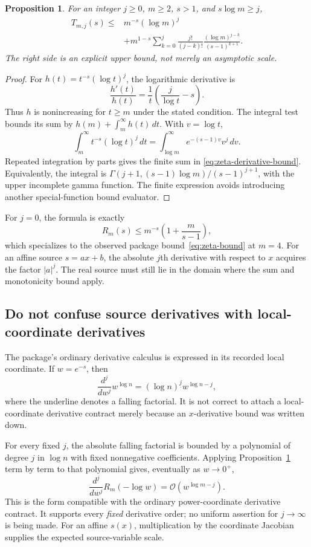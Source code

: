 \documentclass[11pt,letterpaper]{article}
\newcommand{\OO}{\mathcal O}
\newtheorem{proposition}{Proposition}[section]
\begin{document}
\begin{proposition}\label{prop:zeta-derivative}
For an integer $j\ge0$, $m\ge2$, $s>1$, and $s\log m\ge j$,
\begin{align}
 T_{m,j}(s)\le{}&m^{-s}(\log m)^j\\
 &+m^{1-s}\sum_{k=0}^{j}
       \frac{j!}{(j-k)!}
       \frac{(\log m)^{j-k}}{(s-1)^{k+1}}.
 \label{eq:zeta-derivative-bound}
\end{align}
The right side is an explicit upper bound, not merely an asymptotic scale.
\end{proposition}
\begin{proof}
For $h(t)=t^{-s}(\log t)^j$, the logarithmic derivative is
\[
 \frac{h'(t)}{h(t)}=\frac1t\left(\frac{j}{\log t}-s\right).
\]
Thus $h$ is nonincreasing for $t\ge m$ under the stated condition. The integral
test bounds its sum by $h(m)+\int_m^{\infty}h(t)\,dt$. With $v=\log t$,
\[
 \int_m^{\infty}t^{-s}(\log t)^j\,dt
 =\int_{\log m}^{\infty}e^{-(s-1)v}v^j\,dv.
\]
Repeated integration by parts gives the finite sum in
\eqref{eq:zeta-derivative-bound}. Equivalently, the integral is
$\Gamma(j+1,(s-1)\log m)/(s-1)^{j+1}$, with the upper incomplete gamma
function. The finite expression avoids introducing another special-function
bound evaluator.
\end{proof}

For $j=0$, the formula is exactly
\[
 R_m(s)\le m^{-s}\left(1+\frac{m}{s-1}\right),
\]
which specializes to the observed package bound~\eqref{eq:zeta-bound} at $m=4$.
For an affine source $s=ax+b$, the absolute $j$th derivative with respect to
$x$ acquires the factor $|a|^j$. The real source must still lie in the domain
where the sum and monotonicity bound apply.

\subsection{Do not confuse source derivatives with local-coordinate derivatives}
The package's ordinary derivative calculus is expressed in its recorded local
coordinate. If $w=e^{-s}$, then
\[
 \frac{d^j}{dw^j}w^{\log n}
 = (\log n)^{\underline j}w^{\log n-j},
\]
where the underline denotes a falling factorial. It is not correct to attach
a local-coordinate derivative contract merely because an $x$-derivative bound
was written down.

For every fixed $j$, the absolute falling factorial is bounded by a polynomial
of degree $j$ in $\log n$ with fixed nonnegative coefficients. Applying
Proposition~\ref{prop:zeta-derivative} term by term to that polynomial gives,
eventually as $w\to0^+$,
\[
 \frac{d^j}{dw^j}R_m(-\log w)
       =\OO\!\left(w^{\log m-j}\right).
\]
This is the form compatible with the ordinary power-coordinate derivative
contract. It supports every \emph{fixed} derivative order; no uniform assertion
for $j\to\infty$ is being made. For an affine $s(x)$, multiplication by the
coordinate Jacobian supplies the expected source-variable scale.
\end{document}
